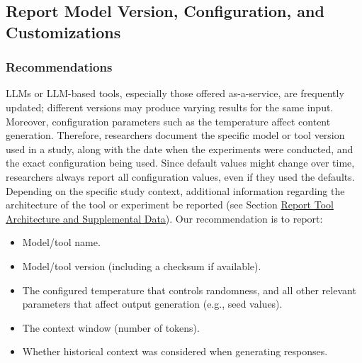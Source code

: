 



\subsection{Report Model Version, Configuration, and Customizations}


\subsubsection{Recommendations}




LLMs or LLM-based tools, especially those offered as-a-service, are frequently updated; different versions may produce varying results for the same input.
Moreover, configuration parameters such as the temperature affect content generation.
Therefore, researchers \must document the specific model or tool version used in a study, along with the date when the experiments were conducted, and the exact configuration being used.
Since default values might change over time, researchers \should always report all configuration values, even if they used the defaults.
Depending on the specific study context, additional information regarding the architecture of the tool or experiment \should be reported (see Section \href{/guidelines/#report-tool-architecture-and-supplemental-data}{Report Tool Architecture and Supplemental Data}).
Our recommendation is to report:

\begin{itemize}
\item Model/tool name.
\item Model/tool version (including a checksum if available).
\item The configured temperature that controls randomness, and all other relevant parameters that affect output generation (e.g., seed values).
\item The context window (number of tokens).
\item Whether historical context was considered when generating responses.
\end{itemize}

